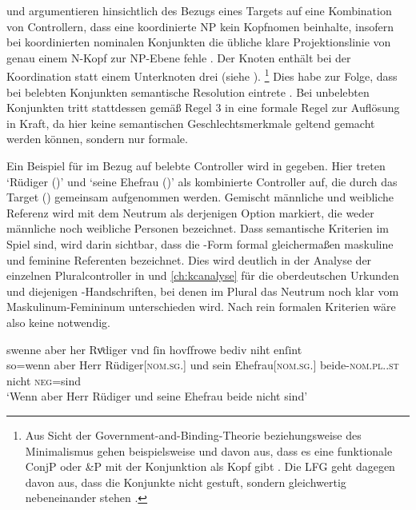 \citet[182--183]{wechslerzlatic2003} und \citet[576]{wechsler2009}
argumentieren hinsichtlich des Bezugs eines Targets auf eine Kombination von
Controllern, dass eine koordinierte NP kein Kopf\-nomen beinhalte, insofern bei
koordinierten nominalen Konjunkten die übliche klare Projektionslinie von genau
einem N-Kopf zur NP-Ebene fehle \autocites[183, Fußnote
85]{wechslerzlatic2003}[585, Fußnote 7]{wechsler2009}. Der Knoten 
enthält bei der Koordination statt einem Unterknoten drei
(siehe ).%
%
	\footnote{Aus Sicht der Government-and-Binding-Theorie beziehungsweise des Minimalismus gehen beispielsweise
	\textcites{johannessen1998}{johannessen2005} und \citet{shen2019} davon
	aus, dass es eine funktionale ConjP oder \&P mit der Konjunktion als Kopf
	gibt \autocite[dagegen aber][]{borsley2005}. Die LFG geht dagegen davon
	aus, dass die Konjunkte nicht gestuft, sondern gleichwertig nebeneinander
	stehen \autocites[vgl.~z.\,B.][]{peterson2004}{sadlernordlinger2006}.}
%
Dies habe zur Folge, dass bei belebten Konjunkten semantische Resolution
eintrete \autocites[183]{wechslerzlatic2003}[576]{wechsler2009}. Bei unbelebten
Konjunkten tritt stattdessen gemäß Regel 3 in  eine formale
Regel zur Auflösung in Kraft, da hier keine semantischen
Geschlechtsmerkmale geltend gemacht werden können, sondern nur formale.

Ein Beispiel für  im Bezug auf belebte Controller wird
in  gegeben. Hier treten  `Rüdiger (\MascM)' und
 `seine Ehefrau (\FemF)' als kombinierte Controller auf, die
durch das Target  (\NeutMF) gemeinsam aufgenommen werden. Gemischt
männliche und weibliche Referenz wird mit dem Neutrum als derjenigen Option
markiert, die weder männliche noch weibliche Personen bezeichnet. Dass
semantische Kriterien im Spiel sind, wird darin sichtbar, dass die
-Form formal gleichermaßen maskuline und feminine Referenten
bezeichnet. Dies wird deutlich in der Analyse der einzelnen Pluralcontroller in
 und \ref{ch:kcanalyse} für die
oberdeutschen Urkunden und diejenigen \KC{}-Handschriften, bei
denen im Plural das Neutrum noch klar vom Maskulinum-Femininum unterschieden
wird. Nach rein formalen Kriterien wäre also keine 
notwendig.

\begin{exe}
\ex \label{ex:gendres2}
		\gll swenne aber her Rvͦdiger vnd ſin
			hovſfrowe bediv niht enſint \\
		so=wenn aber Herr Rüdiger[\textsc{nom.sg.\MascM}] und sein
			Ehefrau[\textsc{nom.sg.\FemF}] beide-\textsc{nom.pl.\NeutMF.st}
			nicht \textsc{neg}=sind \\
		\trans `Wenn aber Herr Rüdiger und seine Ehefrau
			beide nicht  sind'
			\parencites(Nr.~3262, Regensburg, 1299)[425,13--14]{cao4}
\end{exe}

